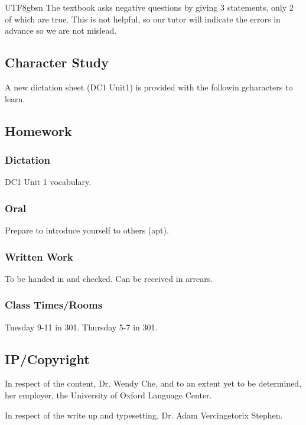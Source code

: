 \documentclass{article}
\newcommand{\myfont}{gbsn} %
\begin{document}
\begin{CJK}{UTF8}{\myfont}
The textbook asks negative questions by giving 3 statements, only 2 of which are true.  This is not helpful, so our tutor will indicate the errors in advance so we are not mislead.

\subsection{Character Study}

A new dictation sheet (DC1 Unit1) is provided with the followin gcharacters to learn.


\subsection{Homework}

\subsubsection{Dictation}

DC1 Unit 1 vocabulary.

\subsubsection{Oral}

Prepare to introduce yourself to others (apt).

\subsubsection{Written Work}

To be handed in and checked.  Can be received in arrears.

\subsubsection{Class Times/Rooms}

Tuesday 9-11 in 301.  Thursday 5-7 in 301.

\subsection{IP/Copyright}

In respect of the content, Dr. Wendy Che, and to an extent yet to be determined, her employer, the University of Oxford Language Center.

In respect of the write up and typesetting, Dr. Adam Vercingetorix Stephen.


\end{CJK} 
\end{document}
